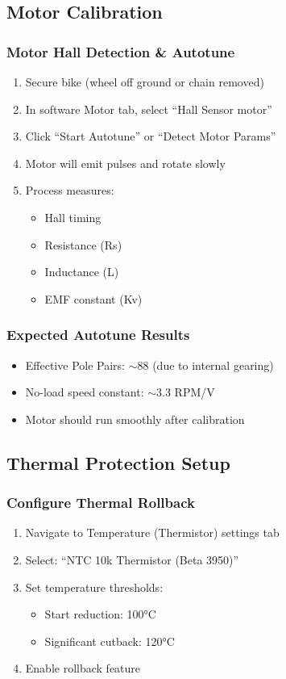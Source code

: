 \documentclass[11pt,a4paper]{article}
\begin{document}
\subsection{Motor Calibration}

\subsubsection{Motor Hall Detection \& Autotune}
\begin{enumerate}
    \item Secure bike (wheel off ground or chain removed)
    \item In software Motor tab, select ``Hall Sensor motor''
    \item Click ``Start Autotune'' or ``Detect Motor Params''
    \item Motor will emit pulses and rotate slowly
    \item Process measures:
    \begin{itemize}
        \item Hall timing
        \item Resistance (Rs)
        \item Inductance (L)
        \item EMF constant (Kv)
    \end{itemize}
\end{enumerate}

\subsubsection{Expected Autotune Results}
\begin{itemize}
    \item Effective Pole Pairs: $\sim$88 (due to internal gearing)
    \item No-load speed constant: $\sim$3.3 RPM/V
    \item Motor should run smoothly after calibration
\end{itemize}

\subsection{Thermal Protection Setup}

\subsubsection{Configure Thermal Rollback}
\begin{enumerate}
    \item Navigate to Temperature (Thermistor) settings tab
    \item Select: ``NTC 10k Thermistor (Beta 3950)''
    \item Set temperature thresholds:
    \begin{itemize}
        \item Start reduction: 100°C
        \item Significant cutback: 120°C
    \end{itemize}
    \item Enable rollback feature
\end{enumerate}
\end{document}
